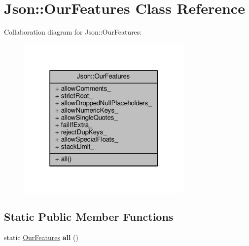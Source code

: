 \hypertarget{classJson_1_1OurFeatures}{}\section{Json\+:\+:Our\+Features Class Reference}
\label{classJson_1_1OurFeatures}


Collaboration diagram for Json\+:\+:Our\+Features\+:
\nopagebreak
\begin{figure}[H]
\begin{center}
\leavevmode
\includegraphics[width=244pt]{d6/dc2/classJson_1_1OurFeatures__coll__graph}
\end{center}
\end{figure}
\subsection*{Static Public Member Functions}
\begin{DoxyCompactItemize}
\item 
static \hyperlink{classJson_1_1OurFeatures}{Our\+Features} {\bfseries all} ()\hypertarget{classJson_1_1OurFeatures_a0686e1406b6677f496529f9f3fe98d1e}{}\label{classJson_1_1OurFeatures_a0686e1406b6677f496529f9f3fe98d1e}

\end{DoxyCompactItemize}
